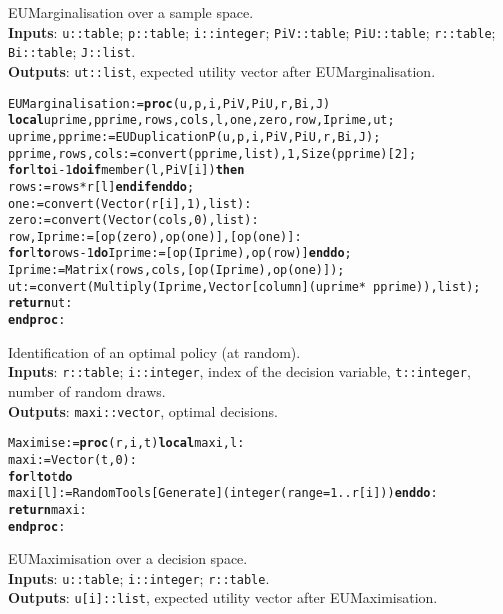 \noindent EUMarginalisation over a sample space. \\
\textbf{Inputs}: \verb|u::table|; \verb|p::table|; \verb|i::integer|; \verb|PiV::table|; \verb|PiU::table|; 
  \verb|r::table|;\\
   \verb|Bi::table|; \verb|J::list|.\\
\textbf{Outputs}: \verb|ut::list|, expected utility vector after EUMarginalisation.


\vspace{-0.4cm}
\begin{alltt}
EUMarginalisation := \textbf{proc}(u, p, i, PiV, PiU, r, Bi, J)
\textbf{local} uprime, pprime, rows, cols, l, one, zero, row, Iprime, ut;
uprime, pprime := EUDuplicationP(u, p, i, PiV, PiU, r, Bi, J);
pprime, rows, cols := convert(pprime, list), 1,  Size(pprime)[2]; 
\textbf{for} l \textbf{to} i-1 \textbf{do} \textbf{if} member(l, PiV[i]) \textbf{then}
  rows := rows*r[l] \textbf{end if} \textbf{end do};
one := convert(Vector(r[i], 1), list): 
zero := convert(Vector(cols, 0), list):
row, Iprime := [op(zero), op(one)],  [op(one)]:
\textbf{for} l \textbf{to} rows-1 \textbf{do} Iprime := [op(Iprime), op(row)] \textbf{end do};
Iprime := Matrix(rows, cols, [op(Iprime), op(one)]);
ut := convert(Multiply(Iprime, Vector[column](uprime*~pprime)), list);
\textbf{return} ut:
\textbf{end proc}:
\end{alltt}


\noindent Identification of an optimal policy (at random). \\
\textbf{Inputs}: \verb|r::table|; \verb|i::integer|, index of the decision variable,
 \verb|t::integer|, number of random draws. \\
\textbf{Outputs}: \verb|maxi::vector|, optimal decisions.

\vspace{-0.4cm}
\begin{alltt}
Maximise := \textbf{proc}(r, i, t) \textbf{local} maxi, l: 
maxi := Vector(t, 0):
\textbf{for} l \textbf{to} t \textbf{do} 
  maxi[l] := RandomTools[Generate](integer(range = 1 .. r[i])) \textbf{end do}:
\textbf{return} maxi:
\textbf{end proc}:
\end{alltt}

\noindent EUMaximisation over a decision space. \\
\textbf{Inputs}: \verb|u::table|; \verb|i::integer|; \verb|r::table|. \\
\textbf{Outputs}: \verb|u[i]::list|, expected utility vector after EUMaximisation.

